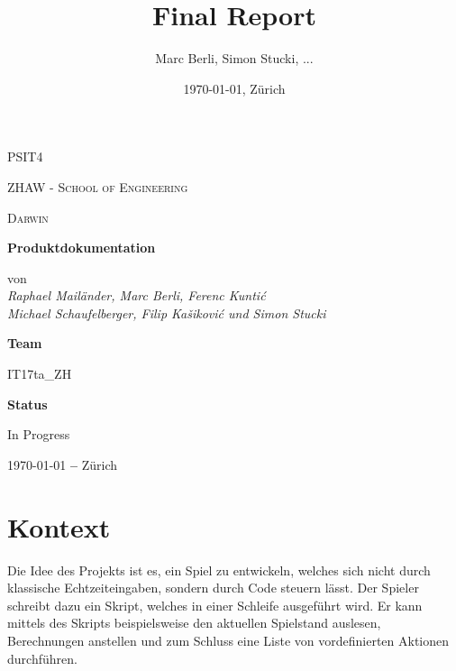 \documentclass[11pt,a4paper]{scrartcl}
\title{Final Report}
\author{Marc Berli, Simon Stucki, ...}
\date{\today{}, Zürich}
\let\oldsection\section
\renewcommand\section{\clearpage\oldsection}
\begin{document}
\begin{titlepage}
  \centering
  {\scshape\LARGE PSIT4 \par}
  \vspace{1cm}
  {\scshape ZHAW - School of Engineering\par}
  \vspace{1cm}
  {\scshape\Large Darwin\par}
  \vspace{1.5cm}
  {\huge\bfseries Produktdokumentation\par}
  \vspace{2cm}
  von
  \vspace{1em}
  \Large\itshape \\ Raphael Mailänder, Marc Berli, Ferenc Kuntić \\ Michael Schaufelberger, Filip Kašiković und Simon Stucki\par
  \vfill
  \textbf{Team}\par
  IT17ta\_ZH\par
  \vspace{2em}
  \textbf{Status}\par
  In Progress

  \vfill

  {\large \today \textbf{ --} Zürich\par}
\end{titlepage}

\tableofcontents

\newpage

\section{Kontext}

Die Idee des Projekts ist es, ein Spiel zu entwickeln, welches sich nicht durch klassische Echtzeiteingaben,
sondern durch Code steuern lässt.
Der Spieler schreibt dazu ein Skript, welches in einer Schleife ausgeführt wird.
Er kann mittels des Skripts beispielsweise den aktuellen Spielstand auslesen, Berechnungen anstellen und zum Schluss eine Liste von vordefinierten Aktionen durchführen.
\end{document}
